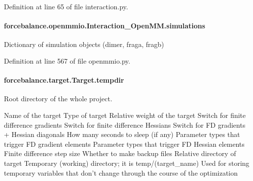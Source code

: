 Definition at line 65 of file interaction.\-py.

\hypertarget{classforcebalance_1_1openmmio_1_1Interaction__OpenMM_a914baf305ebbafd362e9b2ddfb69f7e7}{
\paragraph[{simulations}]{\setlength{\rightskip}{0pt plus 5cm}forcebalance.\-openmmio.\-Interaction\-\_\-\-Open\-M\-M.\-simulations}}\label{classforcebalance_1_1openmmio_1_1Interaction__OpenMM_a914baf305ebbafd362e9b2ddfb69f7e7}


Dictionary of simulation objects (dimer, fraga, fragb) 



Definition at line 567 of file openmmio.\-py.

\hypertarget{classforcebalance_1_1target_1_1Target_aa1f01b5b78db253b5b66384ed11ed193}{
\paragraph[{tempdir}]{\setlength{\rightskip}{0pt plus 5cm}forcebalance.\-target.\-Target.\-tempdir\hspace{0.3cm}{\ttfamily [inherited]}}}\label{classforcebalance_1_1target_1_1Target_aa1f01b5b78db253b5b66384ed11ed193}


Root directory of the whole project. 

Name of the target Type of target Relative weight of the target Switch for finite difference gradients Switch for finite difference Hessians Switch for F\-D gradients + Hessian diagonals How many seconds to sleep (if any) Parameter types that trigger F\-D gradient elements Parameter types that trigger F\-D Hessian elements Finite difference step size Whether to make backup files Relative directory of target Temporary (working) directory; it is temp/(target\-\_\-name) Used for storing temporary variables that don't change through the course of the optimization 

